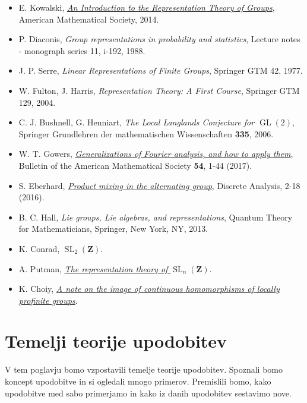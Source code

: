 \documentclass[11pt]{book}
\def\ZZ{\mathbf{Z}}
\DeclareMathOperator\GL{GL}
\DeclareMathOperator\SL{SL}
\def\literatura{\color{modra}}
\theoremstyle{definition}
\theoremstyle{zgled}
\theoremstyle{odprtproblem}
\theoremstyle{domacanaloga}
\theoremstyle{izrek}
\begin{document}
\begin{itemize}
\item {\literatura E. Kowalski, {\em \href{https://people.math.ethz.ch/~kowalski/representation-theory.pdf}{An Introduction to the Representation Theory of Groups}}, American Mathematical Society, 2014.} 
\item {\literatura P. Diaconis, {\em Group representations in probability and statistics}, Lecture notes - monograph series 11, i-192, 1988.}
\item {\literatura J. P. Serre, {\em Linear Representations of Finite Groups}, Springer GTM 42, 1977.}
\item {\literatura W. Fulton, J. Harris, {\em Representation Theory: A First Course}, Springer GTM 129, 2004.}
\item {\literatura C. J. Bushnell, G. Henniart, {\em The Local Langlands Conjecture for $\GL(2)$}, Springer Grundlehren der mathematischen Wissenschaften \textbf{335}, 2006.}
\item {\literatura W. T. Gowers, {\em \href{https://arxiv.org/abs/1608.04127}{Generalizations of Fourier analysis, and how to apply them}},  Bulletin of the American Mathematical Society \textbf{54}, 1-44 (2017).}
\item {\literatura S. Eberhard, {\em \href{https://arxiv.org/abs/1512.03517}{Product mixing in the alternating group}}, Discrete Analysis, 2-18 (2016).}
\item {\literatura B. C. Hall, {\em Lie groups, Lie algebras, and representations}, Quantum Theory for Mathematicians, Springer, New York, NY, 2013.}
\item {\literatura K. Conrad, {\em \href{https://kconrad.math.uconn.edu/blurbs/grouptheory/SL(2,Z).pdf}{$\SL_2(\ZZ)$}}.}
\item {\literatura A. Putman, {\em \href{https://www3.nd.edu/~andyp/notes/RepTheorySLnZ.pdf}{The representation theory of $\SL_n(\ZZ)$}}.}
\item {\literatura K. Choiy, {\em \href{https://www.math.purdue.edu/~tongliu/teaching/598/p-adicrep.pdf}{A note on the image of continuous homomorphisms of locally profinite groups}}.}
\end{itemize}

\chapter{Temelji teorije upodobitev}

V tem poglavju bomo vzpostavili temelje teorije upodobitev. Spoznali bomo koncept upodobitve in si ogledali mnogo primerov. Premislili bomo, kako upodobitve med sabo primerjamo in kako iz danih upodobitev sestavimo nove.
\end{document}

